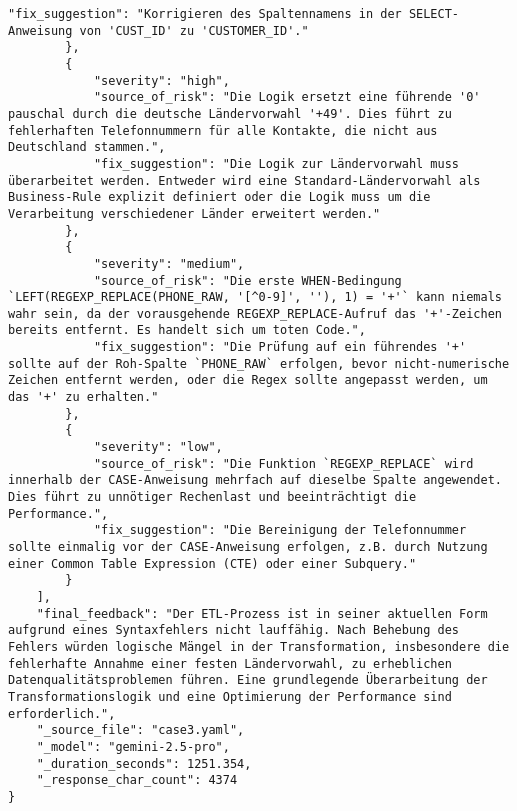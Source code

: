 \begin{lstlisting}[caption={Ausgabe: GEMINI 2.5 Pro Anwendungsfall 3 Hauptdurchlauf},label={gemini_case3_prompt1}]
            "fix_suggestion": "Korrigieren des Spaltennamens in der SELECT-Anweisung von 'CUST_ID' zu 'CUSTOMER_ID'."
        },
        {
            "severity": "high",
            "source_of_risk": "Die Logik ersetzt eine führende '0' pauschal durch die deutsche Ländervorwahl '+49'. Dies führt zu fehlerhaften Telefonnummern für alle Kontakte, die nicht aus Deutschland stammen.",
            "fix_suggestion": "Die Logik zur Ländervorwahl muss überarbeitet werden. Entweder wird eine Standard-Ländervorwahl als Business-Rule explizit definiert oder die Logik muss um die Verarbeitung verschiedener Länder erweitert werden."
        },
        {
            "severity": "medium",
            "source_of_risk": "Die erste WHEN-Bedingung `LEFT(REGEXP_REPLACE(PHONE_RAW, '[^0-9]', ''), 1) = '+'` kann niemals wahr sein, da der vorausgehende REGEXP_REPLACE-Aufruf das '+'-Zeichen bereits entfernt. Es handelt sich um toten Code.",
            "fix_suggestion": "Die Prüfung auf ein führendes '+' sollte auf der Roh-Spalte `PHONE_RAW` erfolgen, bevor nicht-numerische Zeichen entfernt werden, oder die Regex sollte angepasst werden, um das '+' zu erhalten."
        },
        {
            "severity": "low",
            "source_of_risk": "Die Funktion `REGEXP_REPLACE` wird innerhalb der CASE-Anweisung mehrfach auf dieselbe Spalte angewendet. Dies führt zu unnötiger Rechenlast und beeinträchtigt die Performance.",
            "fix_suggestion": "Die Bereinigung der Telefonnummer sollte einmalig vor der CASE-Anweisung erfolgen, z.B. durch Nutzung einer Common Table Expression (CTE) oder einer Subquery."
        }
    ],
    "final_feedback": "Der ETL-Prozess ist in seiner aktuellen Form aufgrund eines Syntaxfehlers nicht lauffähig. Nach Behebung des Fehlers würden logische Mängel in der Transformation, insbesondere die fehlerhafte Annahme einer festen Ländervorwahl, zu erheblichen Datenqualitätsproblemen führen. Eine grundlegende Überarbeitung der Transformationslogik und eine Optimierung der Performance sind erforderlich.",
    "_source_file": "case3.yaml",
    "_model": "gemini-2.5-pro",
    "_duration_seconds": 1251.354,
    "_response_char_count": 4374
}
\end{lstlisting}

